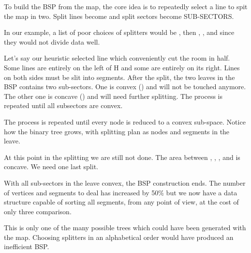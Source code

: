 \par
{}
\par
To build the BSP from the map, the core idea is to repeatedly select a line to spit the map in two. Split lines become  and split sectors become {SUB-SECTORS}.\\ 
\par
In our example, a list of poor choices of splitters would be , then , , and  since they would not divide data well.\\ 
\par
Let's say our heuristic selected line  which conveniently cut  the room in half. Some lines are entirely on the left of H and some are entirely on its right. Lines on both sides must be slit into segments.  After the split, the two leaves in the BSP contains two sub-sectors. One is convex () and will not be touched anymore. The other one is concave () and will need further splitting. The process is repeated until all subsectors are convex.\\
\par
{}
\par
The process is repeated until every node is reduced to a convex sub-space. Notice how the binary tree grows, with splitting plan as nodes and segments in the leave. 
\par
{}
\par
At this point in the splitting we are still not done. The area between , , , and  is concave. We need one last split.\\ 
\par
{}
\par
With all sub-sectors in the leave convex, the BSP construction ends. The number of vertices and segments to deal has increased by 50\% but we now have a data structure capable of sorting all segments, from any point of view, at the cost of only three comparison.\\
\par
This is only one of the many possible trees which could have been generated with the map. Choosing splitters in an alphabetical order would have produced an inefficient BSP.\\




\par

